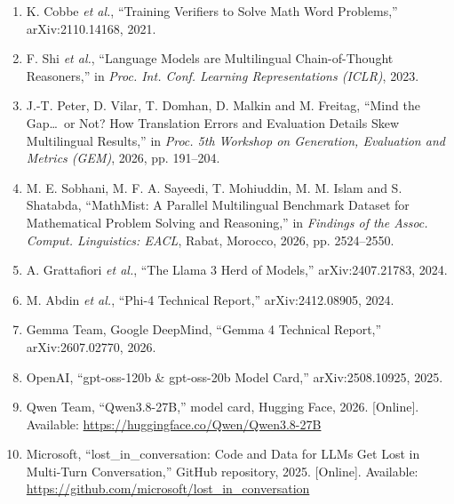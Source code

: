 \documentclass[11pt,a4paper]{article}
\begin{document}
\begin{enumerate}[label={\arabic*.},leftmargin=2em,itemsep=1pt,topsep=2pt]
\item K. Cobbe \textit{et al.}, ``Training Verifiers to Solve Math Word Problems,'' arXiv:2110.14168, 2021.
\item F. Shi \textit{et al.}, ``Language Models are Multilingual Chain-of-Thought Reasoners,'' in \textit{Proc. Int. Conf. Learning Representations (ICLR)}, 2023.
\item J.-T. Peter, D. Vilar, T. Domhan, D. Malkin and M. Freitag, ``Mind the Gap\ldots\ or Not? How Translation Errors and Evaluation Details Skew Multilingual Results,'' in \textit{Proc. 5th Workshop on Generation, Evaluation and Metrics (GEM)}, 2026, pp. 191--204.
\item M. E. Sobhani, M. F. A. Sayeedi, T. Mohiuddin, M. M. Islam and S. Shatabda, ``MathMist: A Parallel Multilingual Benchmark Dataset for Mathematical Problem Solving and Reasoning,'' in \textit{Findings of the Assoc. Comput. Linguistics: EACL}, Rabat, Morocco, 2026, pp. 2524--2550.
\item A. Grattafiori \textit{et al.}, ``The Llama 3 Herd of Models,'' arXiv:2407.21783, 2024.
\item M. Abdin \textit{et al.}, ``Phi-4 Technical Report,'' arXiv:2412.08905, 2024.
\item Gemma Team, Google DeepMind, ``Gemma 4 Technical Report,'' arXiv:2607.02770, 2026.
\item OpenAI, ``gpt-oss-120b \& gpt-oss-20b Model Card,'' arXiv:2508.10925, 2025.
\item Qwen Team, ``Qwen3.8-27B,'' model card, Hugging Face, 2026. [Online]. Available: \url{https://huggingface.co/Qwen/Qwen3.8-27B}
\item Microsoft, ``lost\_in\_conversation: Code and Data for LLMs Get Lost in Multi-Turn Conversation,'' GitHub repository, 2025. [Online]. Available: \url{https://github.com/microsoft/lost_in_conversation}
\end{enumerate}
\end{document}
